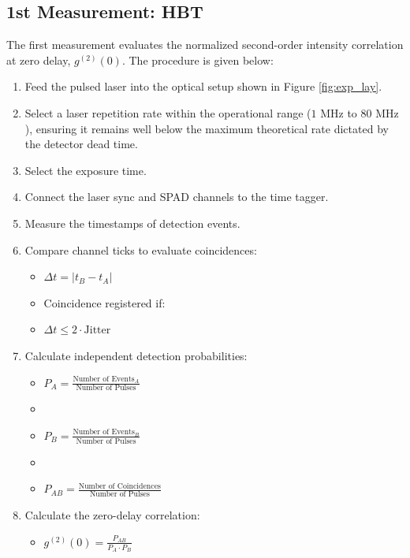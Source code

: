 \subsection{1st Measurement: HBT}
\label{subsec:CorrVal}
The first measurement evaluates the normalized second-order intensity correlation at zero delay, $g^{(2)}(0)$. The procedure is given below: 
\begin{enumerate}
    \item Feed the pulsed laser into the optical setup shown in Figure \ref{fig:exp_lay}. 
    \item Select a laser repetition rate within the operational range ($1 \text{ MHz}$ to $80 \text{ MHz}$), ensuring it remains well below the maximum theoretical rate dictated by the detector dead time. 
    \item Select the exposure time. 
    \item Connect the laser sync and SPAD channels to the time tagger. 
    \item Measure the timestamps of detection events. 
    \item Compare channel ticks to evaluate coincidences:
    \begin{itemize}
        \item[] $\Delta t = |t_{B} - t_{A}|$
        \item[] Coincidence registered if:
        \item[] $\Delta t \leq 2 \cdot \text{Jitter}$
    \end{itemize}
    \item Calculate independent detection probabilities: 
    \begin{itemize}
        \item[] $P_{A} = \frac{\text{Number of Events}_A}{\text{Number of Pulses}}$
        \item[] 
        \item[] $P_{B} = \frac{\text{Number of Events}_B}{\text{Number of Pulses}}$
        \item[] 
        \item[] $P_{AB} = \frac{\text{Number of Coincidences}}{\text{Number of Pulses}}$
    \end{itemize}
    \item Calculate the zero-delay correlation: 
    \begin{itemize}
        \item[] $g^{(2)}(0) = \frac{P_{AB}}{P_{A} \cdot P_{B}} $
    \end{itemize}
\end{enumerate}

